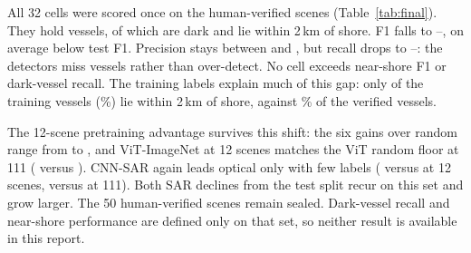 All 32 cells were scored once on the \HevFinalScenes{} human-verified
scenes (Table~\ref{tab:final}). They hold \HevFinalPositives{} vessels, of
which \HevFinalDarkSupport{} are dark and \HevFinalNearShoreSupport{} lie
within 2\,km of shore. F1 falls to \HevFinalFMin--\HevFinalFMax, on average
\HevFinalMeanTestGap{} below test F1. Precision stays between
\HevFinalPrecisionMin{} and \HevFinalPrecisionMax, but recall drops to
\HevFinalRecallMin--\HevFinalRecallMax: the detectors miss vessels rather
than over-detect. No cell exceeds
\HevFinalNearShoreFMax{} near-shore F1 or \HevFinalDarkRecallMax{}
dark-vessel recall. The training labels explain much of this gap: only
\HevTrainNearShorePositives{} of the \HevTrainPositives{} training vessels
(\HevTrainNearShorePct\%) lie within 2\,km of shore, against
\HevFinalNearShorePct\% of the verified vessels.

The 12-scene pretraining advantage survives this shift: the six gains over
random range from \HevDeltaFinalTenCNNOptical{} to
\HevDeltaFinalTenViTImageNet, and ViT-ImageNet at 12 scenes matches the ViT
random floor at 111 (\HevFinalFViTImageNetTen{} versus
\HevFinalFViTRandomHundred). CNN-SAR again leads optical only with few
labels (\HevFinalFCNNSarTen{} versus \HevFinalFCNNOpticalTen{} at 12 scenes,
\HevFinalFCNNSarHundred{} versus \HevFinalFCNNOpticalHundred{} at 111). Both
SAR declines from the test split recur on this set and grow larger.
\else
The 50 human-verified scenes remain sealed. Dark-vessel recall and near-shore
performance are defined only on that set, so neither result is available in
this report.
\fi
